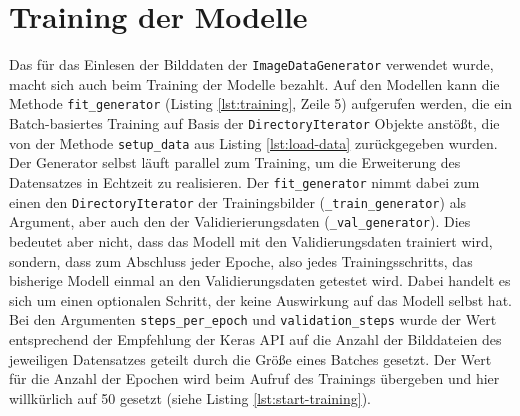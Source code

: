 \section{Training der Modelle}
Das für das Einlesen der Bilddaten der \texttt{ImageDataGenerator} verwendet wurde, macht sich auch beim Training der Modelle bezahlt.
Auf den Modellen kann die Methode \texttt{fit\_generator} (Listing \ref{lst:training}, Zeile 5) aufgerufen werden, die ein Batch-basiertes Training auf Basis der \texttt{DirectoryIterator} Objekte anstößt, die von der Methode \texttt{setup\_data} aus Listing \ref{lst:load-data} zurückgegeben wurden. Der Generator selbst läuft parallel zum Training, um die Erweiterung des Datensatzes in Echtzeit zu realisieren.
Der \texttt{fit\_generator} nimmt dabei zum einen den \texttt{DirectoryIterator} der Trainingsbilder (\texttt{\_train\_generator}) als Argument, aber auch den der Validierierungsdaten (\texttt{\_val\_generator}). Dies bedeutet aber nicht, dass das Modell mit den Validierungsdaten trainiert wird, sondern, dass zum Abschluss jeder Epoche, also jedes Trainingsschritts, das bisherige Modell einmal an den Validierungsdaten getestet wird. Dabei handelt es sich um einen optionalen Schritt, der keine Auswirkung auf das Modell selbst hat.
Bei den Argumenten \texttt{steps\_per\_epoch} und \texttt{validation\_steps} wurde der Wert entsprechend der Empfehlung der Keras API auf die Anzahl der Bilddateien des jeweiligen Datensatzes geteilt durch die Größe eines Batches gesetzt. Der Wert für die Anzahl der Epochen wird beim Aufruf des Trainings übergeben und hier willkürlich auf 50 gesetzt (siehe Listing \ref{lst:start-training}).

